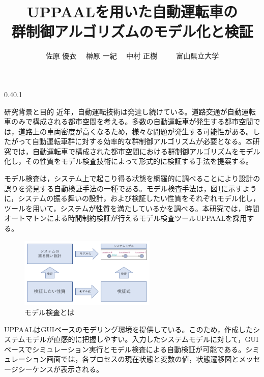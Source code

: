 \documentclass[twocolumn,10pt]{jsarticle}
\author{佐原 優衣	　榊原 一紀	　中村 正樹	　	　富山県立大学}
\date{}
\title{UPPAALを用いた自動運転車の\\群制御アルゴリズムのモデル化と検証}
\makeatletter
\renewcommand{\section}{%
   \@startsection{section}{1}{\z@}%
   {0.4\Cvs}{0.1\Cvs}%
   {\normalfont\large\headfont\raggedright}}
\makeatother
\begin{document}
\maketitle
\thispagestyle{empty}
\section{研究背景と目的}
近年，自動運転技術は発達し続けている。道路交通が自動運転車のみで構成される都市空間を考える。多数の自動運転車が発生する都市空間では，道路上の車両密度が高くなるため，様々な問題が発生する可能性がある。したがって自動運転車群に対する効率的な群制御アルゴリズムが必要となる。本研究では，自動運転車で構成された都市空間における群制御アルゴリズムをモデル化し，その性質をモデル検査技術によって形式的に検証する手法を提案する。

モデル検査は，システム上で起こり得る状態を網羅的に調べることにより設計の誤りを発見する自動検証手法の一種である。モデル検査手法は，図\ref{ModelV}に示すように，システムの振る舞いの設計，および検証したい性質をそれぞれモデル化し，ツールを用いて，システムが性質を満たしているかを調べる。本研究では，時間オートマトンによる時間制約検証が行えるモデル検査ツールUPPAAL\cite{no1}を採用する。
	\begin{figure}[htbp]
	\centering
	\includegraphics[width=65mm]{ModelVerification.png}
	\caption{モデル検査とは}
	\label{ModelV}
	\end{figure}

UPPAALはGUIベースのモデリング環境を提供している。このため，作成したシステムモデルが直感的に把握しやすい。入力したシステムモデルに対して，GUIベースでシミュレーション実行とモデル検査による自動検証が可能である。シミュレーション画面では，各プロセスの現在状態と変数の値，状態遷移図とメッセージシーケンスが表示される。
\end{document}

